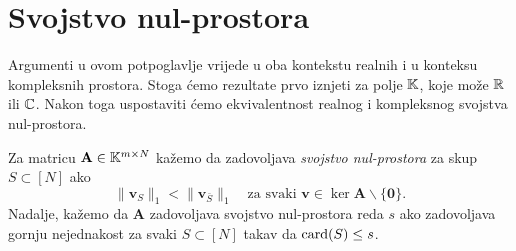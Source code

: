\documentclass[a4paper,twoside,12pt]{memoir} %
\newcommand{\vect}[1]{\mathbf{#1}}
\renewcommand{\vec}{\vect}
\newcommand{\card}{\text{\normalfont{card}}}
\newcommand{\norm}[1]{\|{#1}\|}
\begin{document}
\section[Svojstvo nul-prostora][Svojstvo nul-prostora]{Svojstvo nul-prostora}
Argumenti u ovom potpoglavlje vrijede u oba kontekstu realnih i u konteksu kompleksnih prostora. Stoga \'cemo rezultate prvo iznjeti za polje $\mathbb{K}$, koje mo\v{z}e $\mathbb{R}$ ili $\mathbb{C}$. Nakon toga uspostaviti \'cemo ekvivalentnost realnog i kompleksnog svojstva nul-prostora.

\begin{defn}
    Za matricu $\vec A \in \K^{m \times N}$ ka\v{z}emo da zadovoljava \textit{svojstvo nul-prostora} za skup $S \subset [N]$ ako
    \begin{equation}\label{svojstvo_nul_prostora}
        \norm{\vec v_S}_1 < \norm{\vec v_{\bar{S}}}_1  \quad \text{za svaki }\vec v \in \ker \vec A \backslash \{\vec 0\}.
    \end{equation}
    Nadalje, ka\v{z}emo da $\vec A$ zadovoljava svojstvo nul-prostora reda $s$ ako zadovoljava gornju nejednakost za svaki $S \subset [N]$ takav da $\card(S) \leq s$.
\end{defn}
\end{document}
